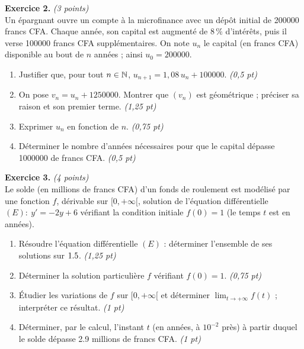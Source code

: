 \smallskip
\noindent\textbf{Exercice 2.} \hfill\textit{(3 points)}\\
Un épargnant ouvre un compte à la microfinance avec un dépôt initial de \num{200000}
francs CFA. Chaque année, son capital est augmenté de $8\,\%$ d'intérêts, puis il verse
\num{100000} francs CFA supplémentaires. On note $u_n$ le capital (en francs CFA)
disponible au bout de $n$ années ; ainsi $u_0=\num{200000}$.
\begin{enumerate}[label=\arabic*)]
\item Justifier que, pour tout $n\in\mathbb{N}$, $u_{n+1}=1{,}08\,u_n+\num{100000}$. \hfill\textit{(0,5 pt)}
\item On pose $v_n=u_n+\num{1250000}$. Montrer que $(v_n)$ est géométrique ; préciser sa
raison et son premier terme. \hfill\textit{(1,25 pt)}
\item Exprimer $u_n$ en fonction de $n$. \hfill\textit{(0,75 pt)}
\item Déterminer le nombre d'années nécessaires pour que le capital dépasse
\num{1000000} de francs CFA. \hfill\textit{(0,5 pt)}
\end{enumerate}

\smallskip
\noindent\textbf{Exercice 3.} \hfill\textit{(4 points)}\\
Le solde (en millions de francs CFA) d'un fonds de roulement est modélisé par une fonction
$f$, dérivable sur $[0,+\infty[$, solution de l'équation différentielle
$(E):\ y'=-2y+6$ vérifiant la condition initiale $f(0)=1$ (le temps $t$ est en années).
\begin{enumerate}[label=\arabic*)]
\item Résoudre l'équation différentielle $(E)$ : déterminer l'ensemble de ses solutions
sur $1.5$. \hfill\textit{(1,25 pt)}
\item Déterminer la solution particulière $f$ vérifiant $f(0)=1$. \hfill\textit{(0,75 pt)}
\item Étudier les variations de $f$ sur $[0,+\infty[$ et déterminer $\displaystyle\lim_{t\to+\infty}f(t)$ ;
interpréter ce résultat. \hfill\textit{(1 pt)}
\item Déterminer, par le calcul, l'instant $t$ (en années, à $10^{-2}$ près) à partir
duquel le solde dépasse \num{2,9} millions de francs CFA. \hfill\textit{(1 pt)}
\end{enumerate}

